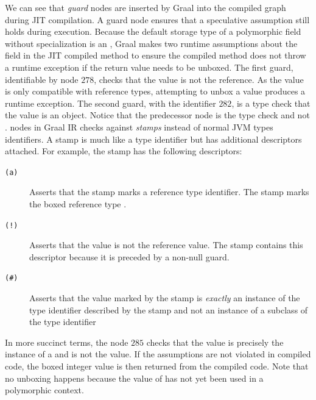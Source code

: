 We can see that \textit{guard} nodes are inserted by Graal into the compiled graph during JIT compilation.
A guard node ensures that a speculative assumption still holds during execution.
Because the default storage type of a polymorphic field without specialization is an , Graal makes two runtime assumptions about the field in the JIT compiled  method to ensure the compiled method does not throw a runtime exception if the return value needs to be unboxed.
The first guard, identifiable by node $278$, checks that the value is not the  reference.
As the  value is only compatible with reference types, attempting to unbox a  value produces a runtime exception.
The second guard, with the identifier $282$, is a type check that the value is an  object.
Notice that the predecessor node is the type check  and not .
 nodes in Graal IR checks against \textit{stamps} instead of normal JVM types identifiers.
A stamp is much like a type identifier but has additional descriptors attached.
For example, the stamp  has the following descriptors:

\begin{description}
	\item[\texttt{(a)}] Asserts that the stamp marks a reference type identifier. The stamp marks the boxed reference type .
	\item[\texttt{(!)}] Asserts that the value is not the  reference value. The stamp contains this descriptor because it is preceded by a non-null guard.
	\item[\texttt{(\#)}] Asserts that the value marked by the stamp is \textit{exactly} an instance of the type identifier described by the stamp and not an instance of a subclass of the type identifier
\end{description}

In more succinct terms, the  node $285$ checks that the value is precisely the instance of a  and is not the  value. 
If the assumptions are not violated in compiled code, the boxed integer value is then returned from the compiled code.
Note that no unboxing happens because the value of  has not yet been used in a polymorphic context.

